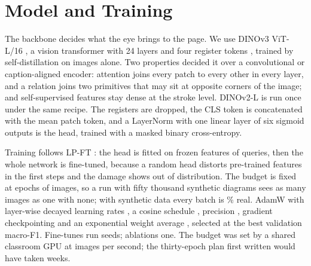 \section{Model and Training}
\label{sec:model}

The backbone decides what the eye brings to the page. We use DINOv3 ViT-L/16 \cite{simeoni2025dinov3}, a vision transformer \cite{dosovitskiy2021vit} with 24 layers and four register tokens \cite{darcet2024registers}, trained by self-distillation on images alone. Two properties decided it over a convolutional \cite{he2016resnet} or caption-aligned \cite{radford2021clip} encoder: attention joins every patch to every other in every layer, and a relation joins two primitives that may sit at opposite corners of the image; and self-supervised features stay dense at the stroke level. DINOv2-L \cite{oquab2024dinov2} is run once under the same recipe. The registers are dropped, the CLS token is concatenated with the mean patch token, and a LayerNorm with one linear layer of six sigmoid outputs is the head, trained with a masked binary cross-entropy.

Training follows LP-FT \cite{kumar2022lpft}: the head is fitted on frozen features of \ftLPQueries{} queries, then the whole network is fine-tuned, because a random head distorts pre-trained features in the first steps and the damage shows out of distribution. The budget is fixed at \ftEpochs{} epochs of \ftEpochImages{} images, so a run with fifty thousand synthetic diagrams sees as many images as one with none; with synthetic data every batch is \ftRealFractionPct\% real. AdamW \cite{loshchilov2019adamw} with layer-wise decayed learning rates \cite{howard2018ulmfit}, a cosine schedule \cite{loshchilov2017sgdr}, \ftAmpDtype{} precision \cite{micikevicius2018amp}, gradient checkpointing \cite{chen2016checkpointing} and an exponential weight average \cite{polyak1992averaging}, selected at the best validation macro-F1. Fine-tunes run \nSeeds{} seeds; ablations one. The budget was set by a shared classroom GPU at \benchTrainImgPerS{} images per second; the thirty-epoch plan first written would have taken weeks.
